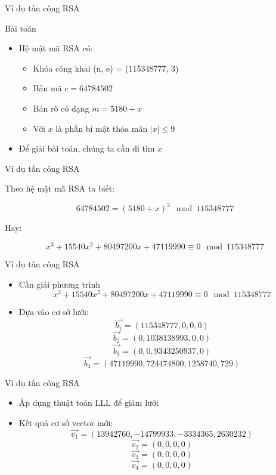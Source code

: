 \begin{frame}{Ví dụ tấn công RSA}

\begin{block}{Bài toán}
\begin{itemize}
\item Hệ mật mã RSA có:

\begin{itemize}
\item Khóa công khai (n, e) = (115348777, 3)
\item Bản mã $c = 64784502$
\item Bản rõ có dạng $m = 5180 + x$
\item Với $x$ là phần bí mật thỏa mãn $|x| \leq 9$
\end{itemize}
\item Để giải bài toán, chúng ta cần đi tìm $x$
\end{itemize}

\end{block}
\end{frame}
\begin{frame}{Ví dụ tấn công RSA}

Theo hệ mật mã RSA ta biết:

\[
64784502 = (5180 + x)^3 \mod 115348777
\]

Hay:

\[
x^3 + 15540x^2 + 80497200x + 47119990 \equiv 0 \mod 115348777
\]

\end{frame}
\begin{frame}{Ví dụ tấn công RSA}

\begin{itemize}
\item Cần giải phương trình
\[
x^3 + 15540x^2 + 80497200x + 47119990 \equiv 0 \mod 115348777
\]
\item Dựa vào cơ sở lưới:
\[
\vec{b_1} = (115348777, 0, 0, 0)
\]
\[
\vec{b_2} = (0, 1038138993, 0, 0)
\]
\[
\vec{b_3} = (0, 0, 9343250937, 0)
\]
\[
\vec{b_4} = (47119990, 724474800, 1258740, 729)
\]
\end{itemize}

\end{frame}
\begin{frame}{Ví dụ tấn công RSA}

\begin{itemize}
\item Áp dụng thuật toán LLL để giảm lưới
\item Kết quả cơ sở vector mới:
\[
\vec{v_1} = (13942760, -14799933, -3334365, 2630232)
\]
\[
\vec{v_2} = (0, 0, 0, 0)
\]
\[
\vec{v_3} = (0, 0, 0, 0)
\]
\[
\vec{v_4} = (0, 0, 0, 0)
\]

\end{itemize}

\end{frame}

